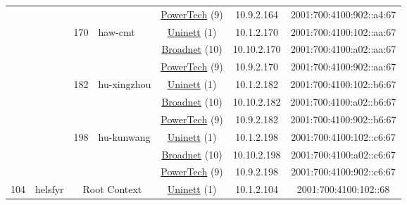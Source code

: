 \begin{small}
\begin{center}
\begin{longtable}{|c|c|c|c|c|c|c|c|}
  &  &  &  & \multicolumn{2}{|c|}{\tiny{\href{http://www.powertech.no}{PowerTech} (9)}} & \tiny{10.9.2.164} & \tiny{2001:700:4100:902::a4:67} \\* \cline{3-3}\cline{4-4}\cline{5-5}\cline{6-6}\cline{7-7}\cline{8-8}
  &  & \multirow{3}{*}{\tiny{170}} & \multicolumn{1}{|l|}{\multirow{3}{*}{\tiny{haw-cmt}}} & \multicolumn{2}{|c|}{\tiny{\href{https://www.uninett.no}{Uninett} (1)}} & \tiny{10.1.2.170} & \tiny{2001:700:4100:102::aa:67} \\* \cline{5-5}\cline{6-6}\cline{7-7}\cline{8-8}
  &  &  &  & \multicolumn{2}{|c|}{\tiny{\href{https://www.broadnet.no}{Broadnet} (10)}} & \tiny{10.10.2.170} & \tiny{2001:700:4100:a02::aa:67} \\* \cline{5-5}\cline{6-6}\cline{7-7}\cline{8-8}
  &  &  &  & \multicolumn{2}{|c|}{\tiny{\href{http://www.powertech.no}{PowerTech} (9)}} & \tiny{10.9.2.170} & \tiny{2001:700:4100:902::aa:67} \\* \cline{3-3}\cline{4-4}\cline{5-5}\cline{6-6}\cline{7-7}\cline{8-8}
  &  & \multirow{3}{*}{\tiny{182}} & \multicolumn{1}{|l|}{\multirow{3}{*}{\tiny{hu-xingzhou}}} & \multicolumn{2}{|c|}{\tiny{\href{https://www.uninett.no}{Uninett} (1)}} & \tiny{10.1.2.182} & \tiny{2001:700:4100:102::b6:67} \\* \cline{5-5}\cline{6-6}\cline{7-7}\cline{8-8}
  &  &  &  & \multicolumn{2}{|c|}{\tiny{\href{https://www.broadnet.no}{Broadnet} (10)}} & \tiny{10.10.2.182} & \tiny{2001:700:4100:a02::b6:67} \\* \cline{5-5}\cline{6-6}\cline{7-7}\cline{8-8}
  &  &  &  & \multicolumn{2}{|c|}{\tiny{\href{http://www.powertech.no}{PowerTech} (9)}} & \tiny{10.9.2.182} & \tiny{2001:700:4100:902::b6:67} \\* \cline{3-3}\cline{4-4}\cline{5-5}\cline{6-6}\cline{7-7}\cline{8-8}
  &  & \multirow{3}{*}{\tiny{198}} & \multicolumn{1}{|l|}{\multirow{3}{*}{\tiny{hu-kunwang}}} & \multicolumn{2}{|c|}{\tiny{\href{https://www.uninett.no}{Uninett} (1)}} & \tiny{10.1.2.198} & \tiny{2001:700:4100:102::c6:67} \\* \cline{5-5}\cline{6-6}\cline{7-7}\cline{8-8}
  &  &  &  & \multicolumn{2}{|c|}{\tiny{\href{https://www.broadnet.no}{Broadnet} (10)}} & \tiny{10.10.2.198} & \tiny{2001:700:4100:a02::c6:67} \\* \cline{5-5}\cline{6-6}\cline{7-7}\cline{8-8}
  &  &  &  & \multicolumn{2}{|c|}{\tiny{\href{http://www.powertech.no}{PowerTech} (9)}} & \tiny{10.9.2.198} & \tiny{2001:700:4100:902::c6:67} \\ \hline
 \multirow{36}{*}{\tiny{104}} & \multicolumn{1}{|l|}{\multirow{36}{*}{\tiny{helsfyr}}} & \multicolumn{2}{|c|}{\multirow{3}{*}{\tiny{Root Context}}} & \multicolumn{2}{|c|}{\tiny{\href{https://www.uninett.no}{Uninett} (1)}} & \tiny{10.1.2.104} & \tiny{2001:700:4100:102::68} \\* \cline{5-5}\cline{6-6}\cline{7-7}\cline{8-8}

\end{longtable}
\end{center}
\end{small}
